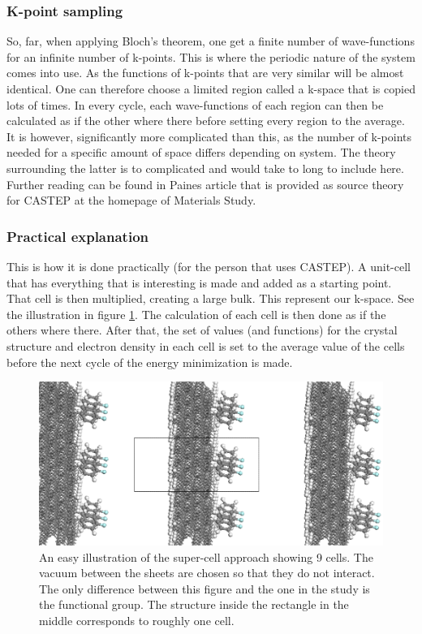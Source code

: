 \documentclass[12pt,a4paper]{article}
\begin{document}
\subsubsection{K-point sampling}
So, far, when applying Bloch's theorem, one get a finite number of wave-functions for an infinite number of k-points. This is where the periodic nature of the system comes into use. As the functions of k-points that are very similar will be almost identical. One can therefore choose a limited region called a k-space that is copied lots of times. In every cycle, each wave-functions of each region can then be calculated as if the other where there before setting every region to the average. It is however, significantly more complicated than this, as the number of k-points needed for a specific amount of space differs depending on system. The theory surrounding the latter is to complicated and would take to long to include here. Further reading can be found in Paines article that is provided as source theory for CASTEP at the homepage of Materials Study. \cite{paine}

\subsubsection{Practical explanation}
This is how it is done practically (for the person that uses CASTEP). A unit-cell that has everything that is interesting is made and added as a starting point. That cell is then multiplied, creating a large bulk. This represent our k-space. See the illustration in figure \ref{supercell}. The calculation of each cell is then done as if the others where there. After that, the set of values (and functions) for the crystal structure and electron density in each cell is set to the average value of the cells before the next cycle of the energy minimization is made.

\begin{figure} \captionsetup{width=.8\linewidth} \caption{An easy illustration of the super-cell approach showing 9 cells. The vacuum between the sheets are chosen so that they do not interact. The only difference between this figure and the one in the study is the functional group. The structure inside the rectangle in the middle corresponds to roughly one cell.} \label{supercell}
%
\includegraphics[width=.8\linewidth]{pictures/supercellvacuum.png}
\end{figure}

\printbibliography
\end{document}
